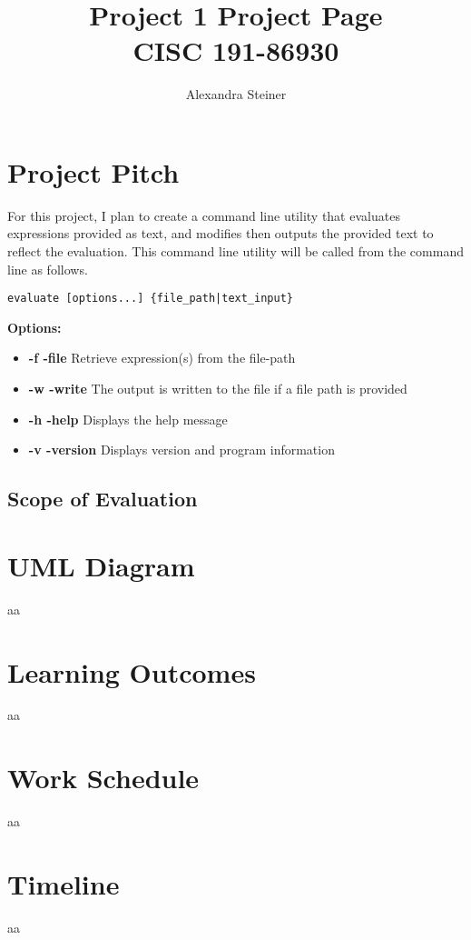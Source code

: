 \documentclass{article}
\title{%
	Project 1 Project Page\\
    \large CISC 191-86930}
\author{Alexandra Steiner}
\begin{document}
\maketitle

\tableofcontents

\section{Project Pitch}
For this project, I plan to create a command line utility that evaluates expressions provided as text, and modifies then outputs the provided text to reflect the evaluation. This command line utility will be called from the command line as follows.

\begin{lstlisting}
evaluate [options...] {file_path|text_input}
\end{lstlisting}

\textbf{Options:}
\begin{itemize}
	\item \textbf{-f -file} Retrieve expression(s) from the file-path
	\item \textbf{-w -write} The output is written to the file if a file path is provided
	\item \textbf{-h -help} Displays the help message
	\item \textbf{-v -version} Displays version and program information
\end{itemize}

\subsection{Scope of Evaluation}

\section{UML Diagram}
aa
\section{Learning Outcomes}
aa
\section{Work Schedule}
aa
\section{Timeline}
aa
\end{document}
